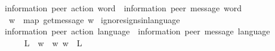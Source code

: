 \begin{isabellebody}
\ \ {\isacharcolon}{\kern0pt}{\isacharcolon}{\kern0pt}\ {\isachardoublequoteopen}{\isacharparenleft}{\kern0pt}{\isacharprime}{\kern0pt}information{\isacharcomma}{\kern0pt}\ {\isacharprime}{\kern0pt}peer{\isacharparenright}{\kern0pt}\ action\ word\ {\isasymRightarrow}\ {\isacharparenleft}{\kern0pt}{\isacharprime}{\kern0pt}information{\isacharcomma}{\kern0pt}\ {\isacharprime}{\kern0pt}peer{\isacharparenright}{\kern0pt}\ message\ word{\isachardoublequoteclose}\ \ {\isacharparenleft}{\kern0pt}{\isachardoublequoteopen}{\isacharunderscore}{\kern0pt}{\isasymdown}\isactrlsub {\isacharbang}{\kern0pt}\isactrlsub {\isacharquery}{\kern0pt}{\isachardoublequoteclose}\ {\isacharbrackleft}{\kern0pt}{}{}{\isacharbrackright}{\kern0pt}\ {}{}{}{\isacharparenright}{\kern0pt}\isanewline
\ \ \isanewline
\ \ \ \ {\isachardoublequoteopen}w{\isasymdown}\isactrlsub {\isacharbang}{\kern0pt}\isactrlsub {\isacharquery}{\kern0pt}\ {\isasymequiv}\ map\ get{\isacharunderscore}{\kern0pt}message\ w{\isachardoublequoteclose}\isanewline
\isanewline
{}\isamarkupfalse%
\ ignore{\isacharunderscore}{\kern0pt}signs{\isacharunderscore}{\kern0pt}in{\isacharunderscore}{\kern0pt}language\isanewline
\ \ {\isacharcolon}{\kern0pt}{\isacharcolon}{\kern0pt}\ {\isachardoublequoteopen}{\isacharparenleft}{\kern0pt}{\isacharprime}{\kern0pt}information{\isacharcomma}{\kern0pt}\ {\isacharprime}{\kern0pt}peer{\isacharparenright}{\kern0pt}\ action\ language\ {\isasymRightarrow}\ {\isacharparenleft}{\kern0pt}{\isacharprime}{\kern0pt}information{\isacharcomma}{\kern0pt}\ {\isacharprime}{\kern0pt}peer{\isacharparenright}{\kern0pt}\ message\ language{\isachardoublequoteclose}\isanewline
\ \ {\isacharparenleft}{\kern0pt}{\isachardoublequoteopen}{\isacharunderscore}{\kern0pt}{\isasymdownharpoonright}\isactrlsub {\isacharbang}{\kern0pt}\isactrlsub {\isacharquery}{\kern0pt}{\isachardoublequoteclose}\ {\isacharbrackleft}{\kern0pt}{}{}{\isacharbrackright}{\kern0pt}\ {}{}{}{\isacharparenright}{\kern0pt}\ \isanewline
\ \ {\isachardoublequoteopen}L{\isasymdownharpoonright}\isactrlsub {\isacharbang}{\kern0pt}\isactrlsub {\isacharquery}{\kern0pt}\ {\isasymequiv}\ {\isacharbraceleft}{\kern0pt}w{\isasymdown}\isactrlsub {\isacharbang}{\kern0pt}\isactrlsub {\isacharquery}{\kern0pt}\ {\isacharbar}{\kern0pt}\ w{\isachardot}{\kern0pt}\ w\ {\isasymin}\ L{\isacharbraceright}{\kern0pt}{\isachardoublequoteclose}\isanewline
\isanewline
%
\end{isabellebody}

